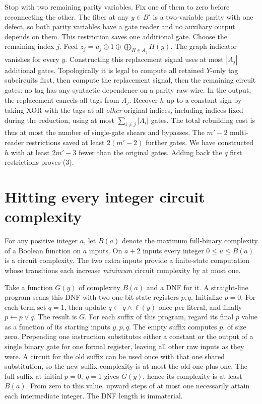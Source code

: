 \documentclass[11pt]{article}
\begin{document}
Stop with two remaining parity variables. Fix one of them to zero before reconnecting the other. The fiber at any \(y\in B'\) is a two-variable parity with one defect, so both parity variables have a gate reader and no auxiliary output depends on them. This restriction saves one additional gate. Choose the remaining index \(j\). Feed \(z_j=u_j\oplus1\oplus\bigoplus_{H\in A_j}H(y)\). The graph indicator vanishes for every \(y\). Constructing this replacement signal uses at most \(|A_j|\) additional gates. Topologically it is legal to compute all retained \(Y\)-only tag subcircuits first, then compute the replacement signal, then the remaining circuit gates: no tag has any syntactic dependence on a parity raw wire. In the output, the replacement cancels all tags from \(A_j\). Recover \(h\) up to a constant sign by taking XOR with the tags at all \emph{other} original indices, including indices fixed during the reduction, using at most \(\sum_{i\ne j}|A_i|\) gates. The total rebuilding cost is thus at most the number of single-gate shears and bypasses. The \(m'-2\) multi-reader restrictions saved at least \(2(m'-2)\) further gates. We have constructed \(h\) with at least \(2m'-3\) fewer than the original gates. Adding back the \(q\) first restrictions proves (3).
\section{Hitting every integer circuit complexity}
For any positive integer \(a\), let \(B(a)\) denote the maximum full-binary complexity of a Boolean function on \(a\) inputs. On \(a+2\) inputs every integer \(0\le u\le B(a)\) is a circuit complexity. The two extra inputs provide a finite-state computation whose transitions each increase \emph{minimum} circuit complexity by at most one.

Take a function \(G(y)\) of complexity \(B(a)\) and a DNF for it. A straight-line program scans this DNF with two one-bit state registers \(p,q\). Initialize \(p=0\). For each term set \(q=1\), then update \(q\gets q\wedge\ell(y)\) once per literal, and finally \(p\gets p\vee q\). The result is \(G\). For each suffix of this program, regard its final \(p\) value as a function of its starting inputs \(y,p,q\). The empty suffix computes \(p\), of size zero. Prepending one instruction substitutes either a constant or the output of a single binary gate for one formal register, leaving all other raw inputs as they were. A circuit for the old suffix can be used once with that one shared substitution, so the new suffix complexity is at most the old one plus one. The full suffix at initial \(p=0,\ q=1\) gives \(G(y)\), hence its complexity is at least \(B(a)\). From zero to this value, upward steps of at most one necessarily attain each intermediate integer. The DNF length is immaterial.
\end{document}

